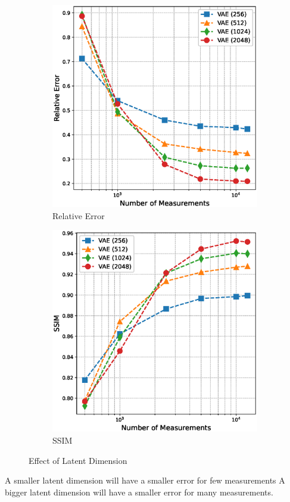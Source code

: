 \begin{figure}[h!]
    \centering
    \begin{subfigure}[b]{0.49\textwidth}
        \includegraphics[width=\textwidth]{figures/06_results/vae_benchmark/effect_of_latent_dimension/effect_of_latent_dimension_relative_error.eps}
        \caption{Relative Error}
    \end{subfigure}
    \begin{subfigure}[b]{0.49\textwidth}
        \includegraphics[width=\textwidth]{figures/06_results/vae_benchmark/effect_of_latent_dimension/effect_of_latent_dimension_ssim.eps}
        \caption{SSIM}
    \end{subfigure}
    \caption{Effect of Latent Dimension}
\end{figure}
A smaller latent dimension will have a smaller error for few measurements
A bigger latent dimension will have a smaller error for many measurements.

